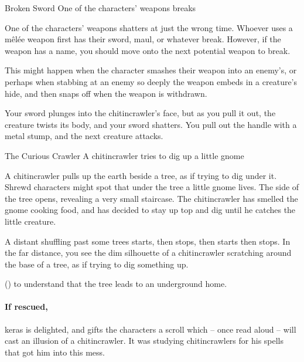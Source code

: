 \label{interruptions}

{\squash Broken Sword}%
{One of the characters' weapons breaks}%

One of the characters' weapons shatters at just the wrong time.
Whoever uses a m\^el\'ee weapon first has their sword, maul, or whatever break.
However, if the weapon has a name, you should move onto the next potential weapon to break.

This might happen when the character smashes their weapon into an enemy's, or perhaps when stabbing at an enemy so deeply the weapon embeds in a creature's hide, and then snaps off when the weapon is withdrawn.

\begin{boxtext}
  Your sword plunges into the chitincrawler's face, but as you pull it out, the creature twists its body, and your sword shatters.
  You pull out the handle with a metal stump, and the next creature attacks.
\end{boxtext}

{The Curious Crawler}%
{A chitincrawler tries to dig up a little gnome}%

A chitincrawler pulls up the earth beside a tree, as if trying to dig under it.
Shrewd characters might spot that under the tree a little gnome lives.
The side of the tree opens, revealing a very small staircase.
The chitincrawler has smelled the gnome cooking food, and has decided to stay up top and dig until he catches the little creature.

\begin{boxtext}
  A distant shuffling past some trees starts, then stops, then starts then stops.
  In the far distance, you see the dim silhouette of a chitincrawler scratching around the base of a tree, as if trying to dig something up.
\end{boxtext}

 (\tn[9]) to understand that the tree leads to an underground home.

\chitincrawler

\keras

\paragraph{If rescued,}
\gls{keras} is delighted, and gifts the characters a scroll which -- once read aloud -- will cast an illusion of a chitincrawler.  It was studying chitincrawlers for his spells that got him into this mess.


